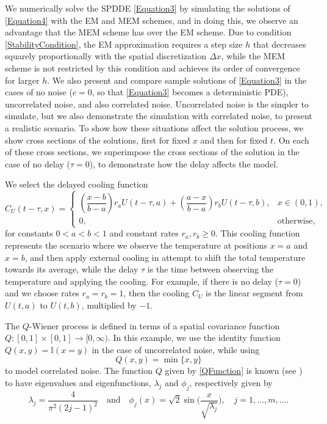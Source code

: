 \documentclass[onefignum]{siamart250211}
\begin{document}
\begin{example}\label{Example4} We numerically solve the SPDDE \cref{Equation3} by simulating the solutions of \cref{Equation4} with the EM and MEM schemes, and in doing this, we observe an advantage that the MEM scheme has over the EM scheme. Due to condition \cref{StabilityCondition}, the EM approximation requires a step size $h$ that decreases squarely proportionally with the spatial discretization $\Delta x$, while the MEM scheme is not restricted by this condition and achieves its order of convergence for larger $h$. We also present and compare sample solutions of \cref{Equation3} in the cases of no noise ($c=0$, so that \cref{Equation3} becomes a deterministic PDE), uncorrelated noise, and also correlated noise. Uncorrelated noise is the simpler to simulate, but we also demonstrate the simulation with correlated noise, to present a realistic scenario. To show how these situations affect the solution process, we show cross sections of the solutions, first for fixed $x$ and then for fixed $t$. On each of these cross sections, we superimpose the cross sections of the solution in the case of no delay ($\tau=0$), to demonstrate how the delay affects the model.

We select the delayed cooling function
\begin{equation}C_U(t-\tau,x)=\begin{cases}\left(\dfrac{x-b}{b-a}\right)r_aU(t-\tau,a)+\left(\dfrac{a-x}{b-a}\right)r_bU(t-\tau,b),&x\in(0,1),\\
0,&\textrm{otherwise},\end{cases}\label{CoolingFunction}\end{equation}
for constants $0<a<b<1$ and constant rates $r_a,r_b\geqslant0$. This cooling function represents the scenario where we observe the temperature at positions $x=a$ and $x=b$, and then apply external cooling in attempt to shift the total temperature towards its average, while the delay $\tau$ is the time between observing the temperature and applying the cooling. For example, if there is no delay ($\tau=0$) and we choose rates $r_a=r_b=1$, then the cooling $C_U$ is the linear segment from $U(t,a)$ to $U(t,b)$, multiplied by $-1$.

The $Q$-Wiener process is defined in terms of a spatial covariance function $Q:[0,1]\times[0,1]\to[0,\infty)$. In this example, we use the identity function $Q(x,y)=\mathbb{I}(x=y)$ in the case of uncorrelated noise, while using
\begin{equation}Q(x,y)=\min\{x,y\}\label{QFunction}\end{equation}
to model correlated noise. The function $Q$ given by \cref{QFunction} is known (see \cite[page 37]{GhanemSpanos1991Book}) to have eigenvalues and eigenfunctions, $\lambda_j$ and $\phi_j$, respectively given by
\[\lambda_j=\frac{4}{\pi^2(2j-1)^2}\quad\textrm{and}\quad\phi_j(x)=\sqrt{2}\sin\bigg(\frac{x}{\sqrt{\lambda_j}}\bigg),\quad j=1,\ldots,m,\ldots.\]



\end{example}
\end{document}
